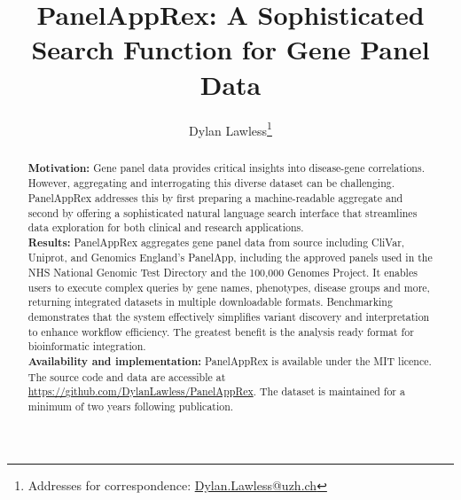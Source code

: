 

\title{PanelAppRex: A Sophisticated Search Function for Gene Panel Data}	
\author[1]{Dylan Lawless\thanks{Addresses for correspondence: \href{mailto:Dylan.Lawless@uzh.ch}{Dylan.Lawless@uzh.ch}}}



\maketitle
\justify


\maketitle

\begin{abstract}
\noindent
\textbf{Motivation:} Gene panel data provides critical insights into disease-gene correlations. However, aggregating and interrogating this diverse dataset can be challenging. PanelAppRex addresses this by first preparing a machine-readable aggregate and second by offering a sophisticated natural language search interface that streamlines data exploration for both clinical and research applications.\\[1ex]
\textbf{Results:} PanelAppRex aggregates gene panel data from source including CliVar, Uniprot, and Genomics England’s PanelApp, including the approved panels used in the NHS National Genomic Test Directory and the 100,000 Genomes Project. It enables users to execute complex queries by gene names, phenotypes, disease groups and more, returning integrated datasets in multiple downloadable formats. Benchmarking demonstrates that the system effectively simplifies variant discovery and interpretation to enhance workflow efficiency. The greatest benefit is the analysis ready format for bioinformatic integration.\\[1ex]
\textbf{Availability and implementation:} PanelAppRex is available under the MIT licence. The source code and data are accessible at \url{https://github.com/DylanLawless/PanelAppRex}. The dataset is maintained for a minimum of two years following publication.
\end{abstract}

